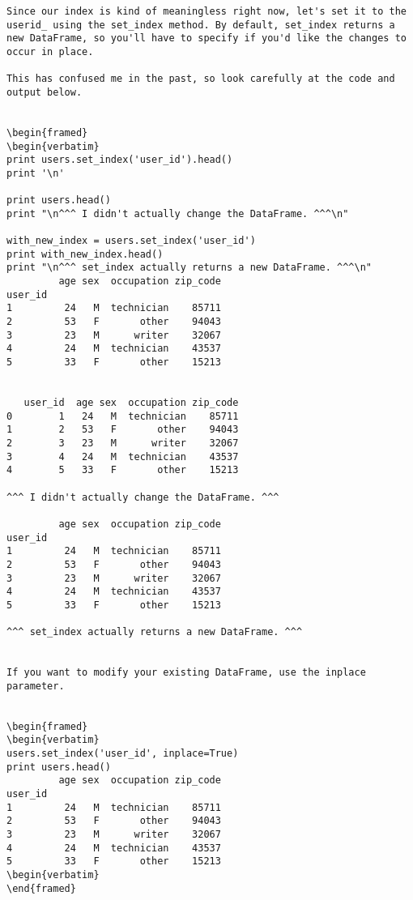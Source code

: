 \begin{framed}
\begin{verbatim}
Since our index is kind of meaningless right now, let's set it to the userid_ using the set_index method. By default, set_index returns a new DataFrame, so you'll have to specify if you'd like the changes to occur in place.

This has confused me in the past, so look carefully at the code and output below.


\begin{framed}
\begin{verbatim}
print users.set_index('user_id').head()
print '\n'

print users.head()
print "\n^^^ I didn't actually change the DataFrame. ^^^\n"

with_new_index = users.set_index('user_id')
print with_new_index.head()
print "\n^^^ set_index actually returns a new DataFrame. ^^^\n"
         age sex  occupation zip_code
user_id                              
1         24   M  technician    85711
2         53   F       other    94043
3         23   M      writer    32067
4         24   M  technician    43537
5         33   F       other    15213


   user_id  age sex  occupation zip_code
0        1   24   M  technician    85711
1        2   53   F       other    94043
2        3   23   M      writer    32067
3        4   24   M  technician    43537
4        5   33   F       other    15213

^^^ I didn't actually change the DataFrame. ^^^

         age sex  occupation zip_code
user_id                              
1         24   M  technician    85711
2         53   F       other    94043
3         23   M      writer    32067
4         24   M  technician    43537
5         33   F       other    15213

^^^ set_index actually returns a new DataFrame. ^^^


If you want to modify your existing DataFrame, use the inplace parameter.


\begin{framed}
\begin{verbatim}
users.set_index('user_id', inplace=True)
print users.head()
         age sex  occupation zip_code
user_id                              
1         24   M  technician    85711
2         53   F       other    94043
3         23   M      writer    32067
4         24   M  technician    43537
5         33   F       other    15213
\begin{verbatim}
\end{framed}


\end{verbatim}
\end{framed}
